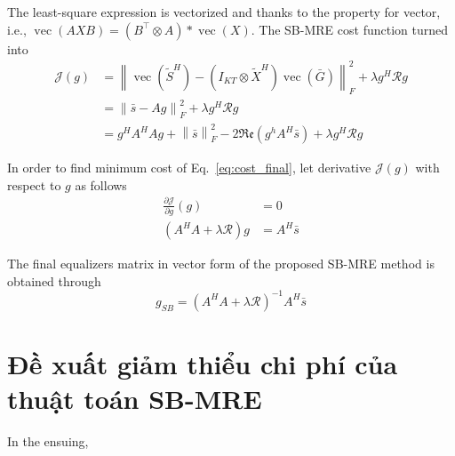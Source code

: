 The least-square expression is vectorized and thanks to the property for vector, i.e., $\operatorname{vec}(AXB) = (B^\top \otimes A) * \operatorname{vec}(X)$. The SB-MRE cost function turned into
\begin{equation}
\label{eq:cost_final}
    \begin{aligned}
    \mathcal{J}(g) &= \left\|\operatorname{vec}(\widetilde{S}^H) - (I_{KT} \otimes \widetilde{X}^H) \operatorname{vec}(\bar{G})\right\|^2_F + \lambda g^H \mathcal{R} g\\
         &= \left\| \bar{s} - A g \right\|^2_F + \lambda g^H \mathcal{R} g \\
         &= g^H A^H A g + \left\| \bar{s} \right\|^2_F - 2\mathfrak{Re} (g^h A^H \bar{s}) + \lambda g^H \mathcal{R} g    \end{aligned}
\end{equation}

In order to find minimum cost of Eq.~\ref{eq:cost_final}, let derivative $\mathcal{J}(g)$ with respect to $g$ as follows
\begin{equation}
\begin{aligned}
\frac{\partial \mathcal{J}}{\partial g}(g) &= 0 \\
\left(A^H A+\lambda \mathcal{R}\right) g &= A^H \bar{s}
\end{aligned}
\end{equation}

The final equalizers matrix in vector form of the proposed SB-MRE method is obtained through
\begin{equation}
    g_{SB}=\left(A^H A + \lambda \mathcal{R}\right)^{-1} A^H \bar{s}
\end{equation}

\section{Đề xuất giảm thiểu chi phí của thuật toán SB-MRE}


In the ensuing, 

